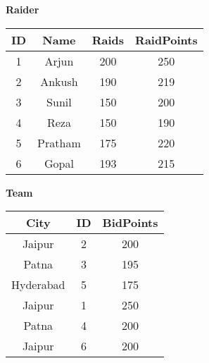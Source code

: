 \textbf{Raider}
\begin{center}
\begin{tabular}{|c|c|c|c|}
\hline
ID & Name & Raids & RaidPoints\\
\hline
1 & Arjun & 200 & 250 \\
2 & Ankush & 190 & 219 \\
3 & Sunil & 150 & 200 \\
4 & Reza & 150 & 190 \\
5 & Pratham & 175 & 220 \\
6 & Gopal & 193 & 215 \\
\hline
\end{tabular}
\end{center}

\textbf{Team}
\begin{center}
\begin{tabular}{|c|c|c|}
\hline
City & ID & BidPoints\\
\hline
Jaipur & 2 & 200 \\
Patna & 3 & 195 \\
Hyderabad & 5 & 175 \\
Jaipur & 1 & 250 \\
Patna & 4 & 200 \\
Jaipur & 6 & 200 \\
\hline
\end{tabular}
\end{center}
